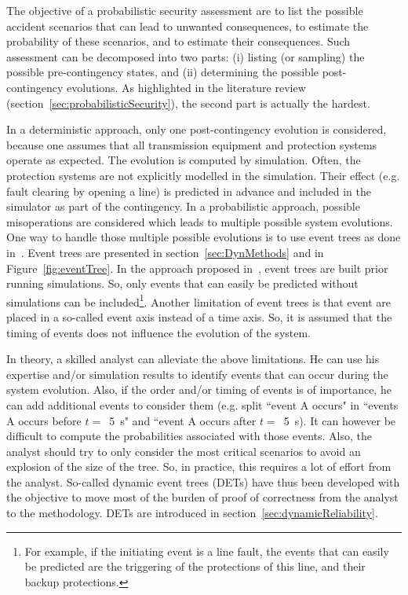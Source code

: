 The objective of a probabilistic security assessment are to list the possible accident scenarios that can lead to unwanted consequences, to estimate the probability of these scenarios, and to estimate their consequences. Such assessment can be decomposed into two parts: (i) listing (or sampling) the possible pre-contingency states, and (ii) determining the possible post-contingency evolutions. As highlighted in the literature review (section~\ref{sec:probabilisticSecurity}), the second part is actually the hardest.

In a deterministic approach, only one post-contingency evolution is considered, because one assumes that all transmission equipment and protection systems operate as expected. The evolution is computed by simulation. Often, the protection systems are not explicitly modelled in the simulation. Their effect (e.g. fault clearing by opening a line) is predicted in advance and included in the simulator as part of the contingency. In a probabilistic approach, possible misoperations are considered which leads to multiple possible system evolutions. One way to handle those multiple possible evolutions is to use event trees as done in~\cite{Haarla, GridPSA}. Event trees are presented in section~\ref{sec:DynMethods} and in Figure~\ref{fig:eventTree}. In the approach proposed in~\cite{Haarla, GridPSA}, event trees are built prior running simulations. So, only events that can easily be predicted without simulations can be included\footnote{For example, if the initiating event is a line fault, the events that can easily be predicted are the triggering of the protections of this line, and their backup protections.}. Another limitation of event trees is that event are placed in a so-called event axis instead of a time axis. So, it is assumed that the timing of events does not influence the evolution of the system.

In theory, a skilled analyst can alleviate the above limitations. He can use his expertise and/or simulation results to identify events that can occur during the system evolution. Also, if the order and/or timing of events is of importance, he can add additional events to consider them (e.g. split ``event A occurs" in ``events A occurs before \(t=\)~5~s" and ``event A occurs after \(t=\)~5~s). It can however be difficult to compute the probabilities associated with those events. Also, the analyst should try to only consider the most critical scenarios to avoid an explosion of the size of the tree. So, in practice, this requires a lot of effort from the analyst. So-called dynamic event trees (DETs) have thus been developed with the objective to move most of the burden of proof of correctness from the analyst to the methodology. DETs are introduced in section~\ref{sec:dynamicReliability}.

